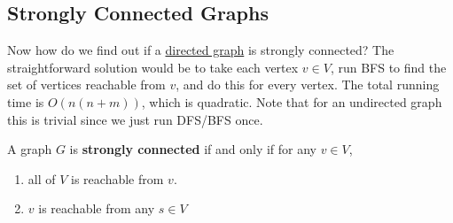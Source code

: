 \subsection{Strongly Connected Graphs}

  Now how do we find out if a \hyperref[def:directed-graph]{directed graph} is strongly connected? The straightforward solution would be to take each vertex $v \in V$, run BFS to find the set of vertices reachable from $v$, and do this for every vertex. The total running time is $O(n(n+m))$, which is quadratic. Note that for an undirected graph this is trivial since we just run DFS/BFS once. 

  \begin{definition}
    \label{def:strongly-connected-graph}
    A graph $G$ is \textbf{strongly connected} if and only if for any $v \in V$, 
    \begin{enumerate}
      \item all of $V$ is reachable from $v$. 
      \item $v$ is reachable from any $s \in V$
    \end{enumerate}

    \begin{figure}[H]
      \centering
      \begin{subfigure}[b]{0.48\textwidth}
        \centering
      \end{subfigure}
      \hfill 
      \begin{subfigure}[b]{0.48\textwidth}
        \centering
\end{subfigure}
\end{figure}
\end{definition}
